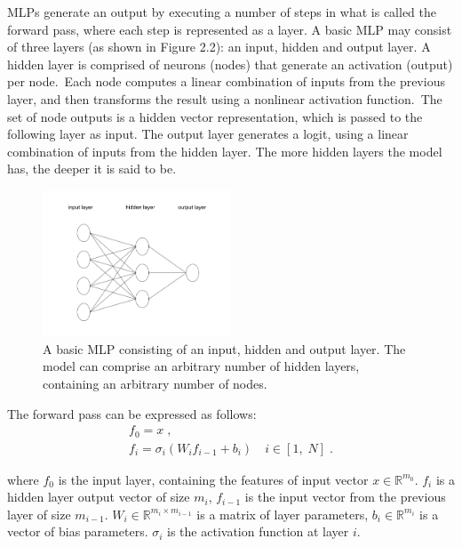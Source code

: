 \noindent MLPs generate an output by executing a number of steps in what is called the forward pass, where each step is represented as a layer. A basic MLP may consist of three layers (as shown in Figure 2.2): an input, hidden and output layer. A hidden layer is comprised of neurons (nodes) that generate an activation (output) per node.\ Each node computes a linear combination of inputs from the previous layer, and then transforms the result using a nonlinear activation function.\ The set of node outputs is a hidden vector representation, which is passed to the following layer as input. The output layer generates a logit, using a linear combination of inputs from the hidden layer. The more hidden layers the model has, the deeper it is said to be.

\begin{figure}[H]
   	\centering
    	\includegraphics[width=0.5\textwidth, height=0.3\textwidth]{multilayer_perceptron}
	\caption{A basic MLP consisting of an input, hidden and output layer. The model can comprise an arbitrary number of hidden layers, containing an arbitrary number of nodes.}
\end{figure}

\noindent The forward pass can be expressed as follows:
\begin{subequations}
	\begin{gather}
		f_0 = x \; , \\
		f_i=\sigma_i(W_{i}f_{i - 1} + b_{i}) \quad i \in [1, \; N] \; .
	\end{gather}
\end{subequations}

\noindent where $ f_0 $ is the input layer, containing the features of input vector $ x \in \mathbb{R}^{m_0} $. $ f_i $ is a hidden layer output vector of size $ m_i $, $ f_{i - 1} $ is the input vector from the previous layer of size $ m_{i-1} $. $ W_{i} \in \mathbb{R}^{m_i \times m_{i - 1}} $ is a matrix of layer parameters, $ b_{i} \in \mathbb{R}^{m_i} $ is a vector of bias parameters. $ \sigma_i $ is the activation function at layer $ i $.

